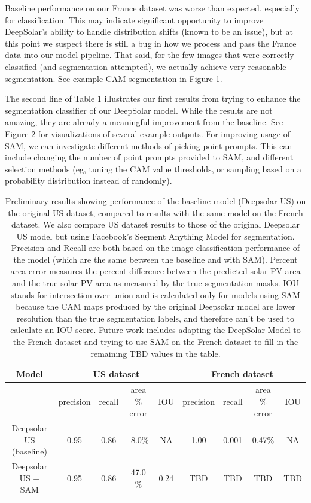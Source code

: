 \documentclass[10pt,twocolumn,letterpaper]{article}
\begin{document}
Baseline performance on our France dataset was worse than expected, especially for classification. This may indicate significant opportunity to improve DeepSolar's ability to handle distribution shifts (known to be an issue), but at this point we suspect there is still a bug in how we process and pass the France data into our model pipeline. That said, for the few images that were correctly classified (and segmentation attempted), we actually achieve very reasonable segmentation. See example CAM segmentation in Figure 1. 

The second line of Table 1 illustrates our first results from trying to enhance the segmentation classifier of our DeepSolar model. While the results are not amazing, they are already a meaningful improvement from the baseline. See Figure 2 for visualizations of several example outputs. For improving usage of SAM, we can investigate different methods of picking point prompts. This can include changing the number of point prompts provided to SAM, and different selection methods (eg, tuning the CAM value thresholds, or sampling based on a probability distribution instead of randomly).


\begin{table}[htp]

\begin{tabular}{||c | c | c | c | c | c | c | c  | c ||}
\hline
Model & \multicolumn{4}{c|}{US dataset} & \multicolumn{4}{c|}{French dataset} \\ [0.5ex] 
\hline\hline
{} & precision & recall & area \% error & IOU & precision & recall & area \% error & IOU \\ 
\hline
Deepsolar US (baseline) & 0.95 & 0.86 & -8.0\% & NA & 1.00 & 0.001 & 0.47\% & NA \\ 
\hline
Deepsolar US + SAM &  0.95 & 0.86 & 47.0 \% & 0.24 & TBD & TBD & TBD & TBD\\ 
\hline

\end{tabular}
\begin{center}

\caption{Preliminary results showing performance of the baseline model (Deepsolar US) on the original US dataset, compared to results with the same model on the French dataset. We also compare US dataset results to those of the original Deepsolar US model but using Facebook's Segment Anything Model for segmentation. Precision and Recall are both based on the image classification performance of the model (which are the same between the baseline and with SAM). Percent area error measures the percent difference between the predicted solar PV area and the true solar PV area as measured by the true segmentation masks. IOU stands for intersection over union and is calculated only for models using SAM because the CAM maps produced by the original Deepsolar model are lower resolution than the true segmentation labels, and therefore can't be used to calculate an IOU score. Future work includes adapting the DeepSolar Model to the French dataset and trying to use SAM on the French dataset to fill in the remaining TBD values in the table. }

\end{center}
\end{table}
\end{document}
